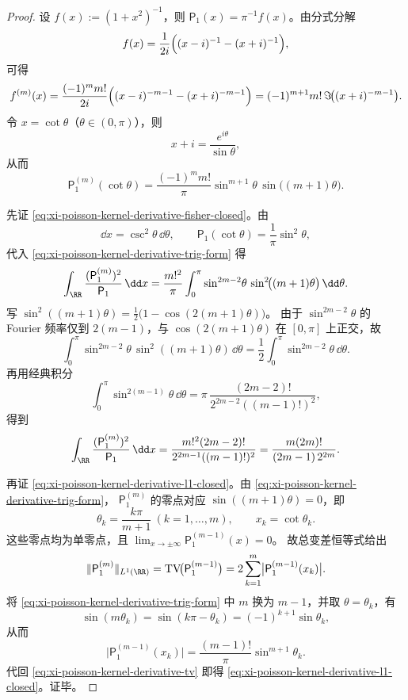 \begin{proof}
设 \(f(x):=(1+x^2)^{-1}\)，则 \(\mathsf P_1(x)=\pi^{-1}f(x)\)。由分式分解
\[
f(x)=\frac{1}{2i}\Bigl((x-i)^{-1}-(x+i)^{-1}\Bigr),
\]
可得
\[
f^{(m)}(x)
=\frac{(-1)^m m!}{2i}\Bigl((x-i)^{-m-1}-(x+i)^{-m-1}\Bigr)
=(-1)^{m+1}m!\,\Im\!\bigl((x+i)^{-m-1}\bigr).
\]
令 \(x=\cot\theta\)（\(\theta\in(0,\pi)\)），则
\[
x+i=\frac{e^{i\theta}}{\sin\theta},
\]
从而
\begin{equation}\label{eq:xi-poisson-kernel-derivative-trig-form}
\mathsf P_1^{(m)}(\cot\theta)
=\frac{(-1)^m m!}{\pi}\sin^{m+1}\!\theta\,\sin\!\bigl((m+1)\theta\bigr).
\end{equation}

先证 \eqref{eq:xi-poisson-kernel-derivative-fisher-closed}。由
\[
\dd x=\csc^2\theta\,\dd\theta,\qquad
\mathsf P_1(\cot\theta)=\frac1\pi\sin^2\theta,
\]
代入 \eqref{eq:xi-poisson-kernel-derivative-trig-form} 得
\[
\int_{\RR}\frac{(\mathsf P_1^{(m)})^2}{\mathsf P_1}\,\dd x
=\frac{m!^2}{\pi}
\int_0^\pi
\sin^{2m-2}\!\theta\,
\sin^2\!\bigl((m+1)\theta\bigr)\,\dd\theta.
\]
写
\(
\sin^2((m+1)\theta)=\frac12\bigl(1-\cos(2(m+1)\theta)\bigr)
\)。
由于 \(\sin^{2m-2}\theta\) 的 Fourier 频率仅到 \(2(m-1)\)，与 \(\cos(2(m+1)\theta)\) 在 \([0,\pi]\) 上正交，故
\[
\int_0^\pi\sin^{2m-2}\!\theta\,\sin^2((m+1)\theta)\,\dd\theta
=\frac12\int_0^\pi\sin^{2m-2}\!\theta\,\dd\theta.
\]
再用经典积分
\[
\int_0^\pi\sin^{2(m-1)}\!\theta\,\dd\theta
=\pi\,\frac{(2m-2)!}{2^{2m-2}((m-1)!)^2},
\]
得到
\[
\int_{\RR}\frac{(\mathsf P_1^{(m)})^2}{\mathsf P_1}\,\dd x
=\frac{m!^2(2m-2)!}{2^{2m-1}((m-1)!)^2}
=\frac{m(2m)!}{(2m-1)\,2^{2m}}.
\]

再证 \eqref{eq:xi-poisson-kernel-derivative-l1-closed}。由
\eqref{eq:xi-poisson-kernel-derivative-trig-form}，
\(\mathsf P_1^{(m)}\) 的零点对应
\(
\sin((m+1)\theta)=0
\)，即
\[
\theta_k=\frac{k\pi}{m+1}\ (k=1,\dots,m),\qquad
x_k=\cot\theta_k.
\]
这些零点均为单零点，且
\(
\lim_{x\to\pm\infty}\mathsf P_1^{(m-1)}(x)=0
\)。
故总变差恒等式给出
\begin{equation}\label{eq:xi-poisson-kernel-derivative-tv}
\|\mathsf P_1^{(m)}\|_{L^1(\RR)}
=\mathrm{TV}\!\bigl(\mathsf P_1^{(m-1)}\bigr)
=2\sum_{k=1}^{m}\bigl|\mathsf P_1^{(m-1)}(x_k)\bigr|.
\end{equation}
将 \eqref{eq:xi-poisson-kernel-derivative-trig-form} 中 \(m\) 换为 \(m-1\)，并取 \(\theta=\theta_k\)，有
\[
\sin(m\theta_k)=\sin(k\pi-\theta_k)=(-1)^{k+1}\sin\theta_k,
\]
从而
\[
\bigl|\mathsf P_1^{(m-1)}(x_k)\bigr|
=\frac{(m-1)!}{\pi}\sin^{m+1}\!\theta_k.
\]
代回 \eqref{eq:xi-poisson-kernel-derivative-tv} 即得 \eqref{eq:xi-poisson-kernel-derivative-l1-closed}。证毕。
\end{proof}


